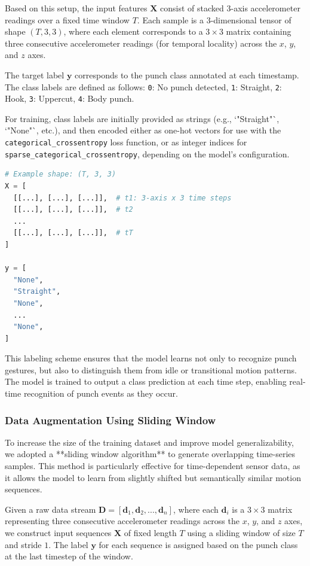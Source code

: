 \documentclass{article}
\begin{document}
Based on this setup, the input features $\mathbf{X}$ consist of stacked 3-axis accelerometer readings over a fixed time window $T$. Each sample is a 3-dimensional tensor of shape $(T, 3, 3)$, where each element corresponds to a $3 \times 3$ matrix containing three consecutive accelerometer readings (for temporal locality) across the $x$, $y$, and $z$ axes.

The target label $\mathbf{y}$ corresponds to the punch class annotated at each timestamp. The class labels are defined as follows:  
\texttt{0}: No punch detected,  
\texttt{1}: Straight,  
\texttt{2}: Hook,  
\texttt{3}: Uppercut,  
\texttt{4}: Body punch.

For training, class labels are initially provided as strings (e.g., `"Straight"`, `"None"`, etc.), and then encoded either as one-hot vectors for use with the \texttt{categorical\_crossentropy} loss function, or as integer indices for \texttt{sparse\_categorical\_crossentropy}, depending on the model's configuration.

\begin{lstlisting}[language=Python, caption={Example input-output data format}]
# Example shape: (T, 3, 3)
X = [
  [[...], [...], [...]],  # t1: 3-axis x 3 time steps
  [[...], [...], [...]],  # t2
  ...
  [[...], [...], [...]],  # tT
]

y = [
  "None",
  "Straight",
  "None",
  ...
  "None",
]
\end{lstlisting}

This labeling scheme ensures that the model learns not only to recognize punch gestures, but also to distinguish them from idle or transitional motion patterns. The model is trained to output a class prediction at each time step, enabling real-time recognition of punch events as they occur.



\subsubsection{Data Augmentation Using Sliding Window}

To increase the size of the training dataset and improve model generalizability, we adopted a **sliding window algorithm** to generate overlapping time-series samples. This method is particularly effective for time-dependent sensor data, as it allows the model to learn from slightly shifted but semantically similar motion sequences.

Given a raw data stream $\mathbf{D} = [\mathbf{d}_1, \mathbf{d}_2, ..., \mathbf{d}_n]$, where each $\mathbf{d}_i$ is a $3 \times 3$ matrix representing three consecutive accelerometer readings across the $x$, $y$, and $z$ axes, we construct input sequences $\mathbf{X}$ of fixed length $T$ using a sliding window of size $T$ and stride $1$. The label $\mathbf{y}$ for each sequence is assigned based on the punch class at the last timestep of the window.
\end{document}
